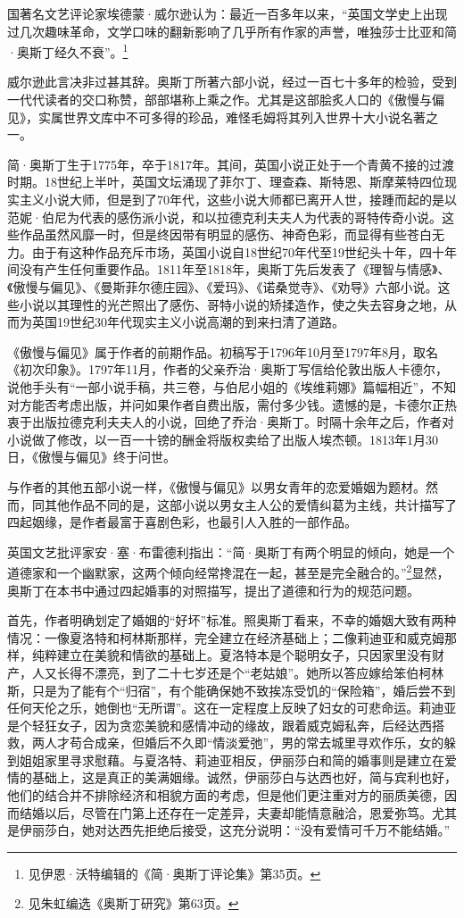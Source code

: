 \par 国著名文艺评论家埃德蒙·威尔逊认为：最近一百多年以来，“英国文学史上出现过几次趣味革命，文学口味的翻新影响了几乎所有作家的声誉，唯独莎士比亚和简·奥斯丁经久不衰”。\footnote{见伊恩·沃特编辑的《简·奥斯丁评论集》第35页。}
\par 威尔逊此言决非过甚其辞。奥斯丁所著六部小说，经过一百七十多年的检验，受到一代代读者的交口称赞，部部堪称上乘之作。尤其是这部脍炙人口的《傲慢与偏见》，实属世界文库中不可多得的珍品，难怪毛姆将其列入世界十大小说名著之一。
\par 简·奥斯丁生于1775年，卒于1817年。其间，英国小说正处于一个青黄不接的过渡时期。18世纪上半叶，英国文坛涌现了菲尔丁、理查森、斯特恩、斯摩莱特四位现实主义小说大师，但是到了70年代，这些小说大师都已离开人世，接踵而起的是以范妮·伯尼为代表的感伤派小说，和以拉德克利夫夫人为代表的哥特传奇小说。这些作品虽然风靡一时，但是终因带有明显的感伤、神奇色彩，而显得有些苍白无力。由于有这种作品充斥市场，英国小说自18世纪70年代至19世纪头十年，四十年间没有产生任何重要作品。1811年至1818年，奥斯丁先后发表了《理智与情感》、《傲慢与偏见》、《曼斯菲尔德庄园》、《爱玛》、《诺桑觉寺》、《劝导》六部小说。这些小说以其理性的光芒照出了感伤、哥特小说的矫揉造作，使之失去容身之地，从而为英国19世纪30年代现实主义小说高潮的到来扫清了道路。
\par 《傲慢与偏见》属于作者的前期作品。初稿写于1796年10月至1797年8月，取名《初次印象》。1797年11月，作者的父亲乔治·奥斯丁写信给伦敦出版人卡德尔，说他手头有“一部小说手稿，共三卷，与伯尼小姐的《埃维莉娜》篇幅相近”，不知对方能否考虑出版，并问如果作者自费出版，需付多少钱。遗憾的是，卡德尔正热衷于出版拉德克利夫夫人的小说，回绝了乔治·奥斯丁。时隔十余年之后，作者对小说做了修改，以一百一十镑的酬金将版权卖给了出版人埃杰顿。1813年1月30日，《傲慢与偏见》终于问世。
\par 与作者的其他五部小说一样，《傲慢与偏见》以男女青年的恋爱婚姻为题材。然而，同其他作品不同的是，这部小说以男女主人公的爱情纠葛为主线，共计描写了四起姻缘，是作者最富于喜剧色彩，也最引人入胜的一部作品。
\par 英国文艺批评家安·塞·布雷德利指出：“简·奥斯丁有两个明显的倾向，她是一个道德家和一个幽默家，这两个倾向经常搀混在一起，甚至是完全融合的。”\footnote{见朱虹编选《奥斯丁研究》第63页。}显然，奥斯丁在本书中通过四起婚事的对照描写，提出了道德和行为的规范问题。
\par 首先，作者明确划定了婚姻的“好坏”标准。照奥斯丁看来，不幸的婚姻大致有两种情况：一像夏洛特和柯林斯那样，完全建立在经济基础上；二像莉迪亚和威克姆那样，纯粹建立在美貌和情欲的基础上。夏洛特本是个聪明女子，只因家里没有财产，人又长得不漂亮，到了二十七岁还是个“老姑娘”。她所以答应嫁给笨伯柯林斯，只是为了能有个“归宿”，有个能确保她不致挨冻受饥的“保险箱”，婚后尝不到任何天伦之乐，她倒也“无所谓”。这在一定程度上反映了妇女的可悲命运。莉迪亚是个轻狂女子，因为贪恋美貌和感情冲动的缘故，跟着威克姆私奔，后经达西搭救，两人才苟合成亲，但婚后不久即“情淡爱弛”，男的常去城里寻欢作乐，女的躲到姐姐家里寻求慰藉。与夏洛特、莉迪亚相反，伊丽莎白和简的婚事则是建立在爱情的基础上，这是真正的美满姻缘。诚然，伊丽莎白与达西也好，简与宾利也好，他们的结合并不排除经济和相貌方面的考虑，但是他们更注重对方的丽质美德，因而结婚以后，尽管在门第上还存在一定差异，夫妻却能情意融洽，恩爱弥笃。尤其是伊丽莎白，她对达西先拒绝后接受，这充分说明：“没有爱情可千万不能结婚。”

